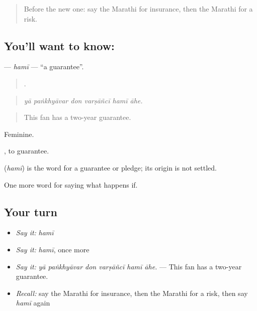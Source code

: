 \label{lesson:MR-C540-hami}



\begin{quote}
Before the new one: say the Marathi for insurance, then the Marathi for a risk.
\end{quote}

\subsection*{You'll want to know: }
\textbf{} — \emph{hamī} — \textquotedblleft{}a guarantee\textquotedblright{}.

\begin{quote}
     .
\end{quote}

\begin{quote}
\emph{yā paṅkhyāvar don varṣāñcī hamī āhe.}
\end{quote}

\begin{quote}
This fan has a two-year guarantee.
\end{quote}

Feminine.

 , to guarantee.

\begin{cousinweb}
\textbf{} (\emph{hamī}) is the word for a guarantee or pledge; its origin is not settled.
\end{cousinweb}

\begin{grammarlens}[title={What you've built}]
One more word for saying what happens if.
\end{grammarlens}

\subsection*{Your turn}
\begin{itemize}
\raggedright
  \item \emph{Say it:} \emph{hamī}
  \item \emph{Say it:} \emph{hamī}, once more
  \item \emph{Say it:} \emph{yā paṅkhyāvar don varṣāñcī hamī āhe.} — This fan has a two-year guarantee.
  \item \emph{Recall:} say the Marathi for insurance, then the Marathi for a risk, then say \emph{hamī} again
\end{itemize}

